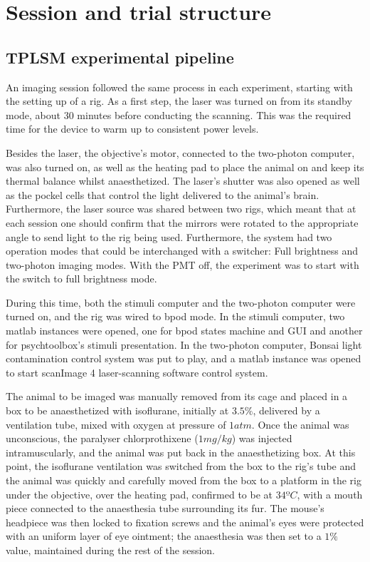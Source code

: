 \section{Session and trial structure}
\label{sec:Session-and-trial-structure}

\subsection{TPLSM experimental pipeline}

An imaging session followed the same process in each experiment, starting with the setting up of a rig.
As a first step, the laser was turned on from its standby mode, about 30 minutes before conducting the scanning. This was the required time for the device to warm up to consistent power levels.

Besides the laser, the objective's motor, connected to the two-photon computer, was also turned on, as well as the heating pad to place the animal on and keep its thermal balance whilst anaesthetized. The laser's shutter was also opened as well as the pockel cells that control the light delivered to the animal's brain. Furthermore, the laser source was shared between two rigs, which meant that at each session one should confirm that the mirrors were rotated to the appropriate angle to send light to the rig being used. Furthermore, the system had two operation modes that could be interchanged with a switcher: Full brightness and two-photon imaging modes. With the PMT off, the experiment was to start with the switch to full brightness mode.

During this time, both the stimuli computer and the two-photon computer were turned on, and the rig was wired to bpod mode. In the stimuli computer, two matlab instances were opened, one for bpod states machine and GUI and another for psychtoolbox's stimuli presentation. In the two-photon computer, Bonsai light contamination control system was put to play, and a matlab instance was opened to start scanImage 4 laser-scanning software control system.

The animal to be imaged was manually removed from its cage and placed in a box to be anaesthetized with isoflurane, initially at $3.5\%$, delivered by a ventilation tube, mixed with oxygen at pressure of $1 atm$. Once the animal was unconscious, the paralyser chlorprothixene ($1 mg/kg$) was injected intramuscularly, and the animal was put back in the anaesthetizing box. At this point, the isoflurane ventilation was switched from the box to the rig's tube and the animal was quickly and carefully moved from the box to a platform in the rig under the objective, over the heating pad, confirmed to be at $34ºC$, with a mouth piece connected to the anaesthesia tube surrounding its fur. The mouse's headpiece was then locked to fixation screws and the animal's eyes were protected with an uniform layer of eye ointment; the anaesthesia was then set to a $1\%$ value, maintained during the rest of the session.

